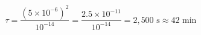 \documentclass[preview]{standalone}
\begin{document}
\[\tau = \frac{(5 \times 10^{-6})^2}{10^{-14}} = \frac{2.5 \times 10^{-11}}{10^{-14}} = 2{,}500 \text{ s} \approx 42 \text{ min}\]
\end{document}
